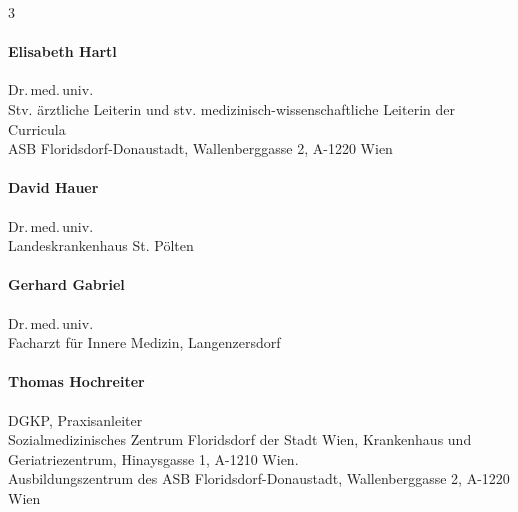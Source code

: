 \begin{WidePar}
\begin{raggedright}
\begin{multicols}{3}
  \bigskip

  \begin{minipage}{\linewidth}\raggedright
    \paragraph{Elisabeth Hartl}
    Dr.\,med.\,univ.\\    [.25\baselineskip]
    Stv. ärztliche Leiterin und stv. medizinisch-wissenschaftliche Leiterin der
    Curricula\\
    {\color{AltBlueDark}ASB Florids\-dorf-Donau\-stadt},
    Wallenberggasse 2, A-1220 Wien
  \end{minipage}

  \bigskip

  \begin{minipage}{\linewidth}\raggedright
    \paragraph{David Hauer}
    Dr.\,med.\,univ.\\[.25\baselineskip]
    {\color{AltBlueDark}Landeskrankenhaus St. Pölten}
  \end{minipage}

  \bigskip

  \begin{minipage}{\linewidth}\raggedright
    \paragraph{Gerhard Gabriel}
    Dr.\,med.\,univ. \\[.25\baselineskip]
    Facharzt für Innere Medizin, Langenzersdorf
  \end{minipage}


  \bigskip

  \begin{minipage}{\linewidth}\raggedright
    \paragraph{Thomas Hochreiter}
    DGKP, Praxisanleiter\\[.25\baselineskip]
    {\color{AltBlueDark}Sozialmedizinisches Zentrum Floridsdorf der Stadt
    Wien}, Krankenhaus und Geriatriezentrum, Hinaysgasse 1,
    A-1210 Wien.\\[.25\baselineskip]
    Ausbildungszentrum des {\color{AltBlueDark}ASB Florids\-dorf-Donau\-stadt},
    Wallenberggasse 2, A-1220 Wien
  \end{minipage}


\end{multicols}
\end{raggedright}
\end{WidePar}
